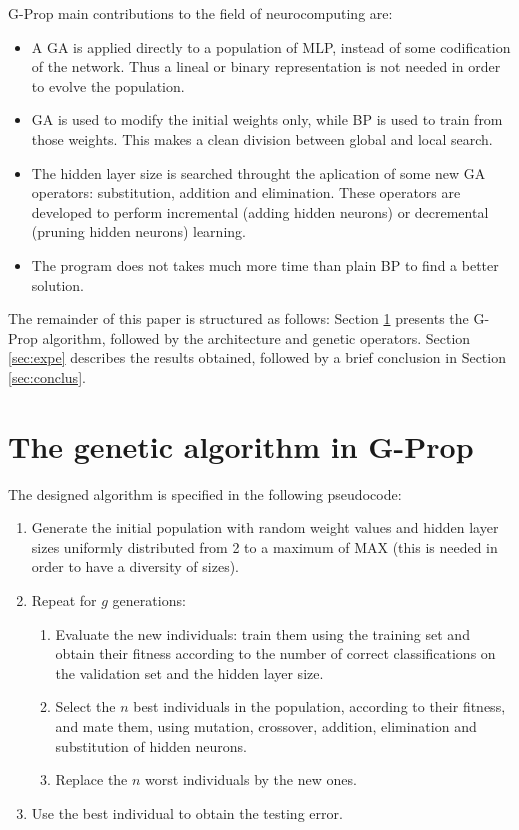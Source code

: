 \documentclass{elsart}
\begin{document}
G-Prop main contributions to the field of neurocomputing are: 
\begin{itemize}
      \item A GA is applied directly to a population of MLP, instead of some codification of the network. Thus a lineal or binary representation is not needed in order to evolve the population.
      \item GA is used to modify the initial weights only, while BP is used to train from those weights. This makes a clean division between global and local search.
      \item The hidden layer size is searched throught the aplication of some new GA operators: substitution, addition and elimination. These operators are developed to perform incremental (adding hidden neurons) or decremental (pruning hidden neurons) learning.
      \item The program does not takes much more time than plain BP to find a better solution.
\end{itemize}


The remainder of this paper is structured as follows: Section \ref{sec:method} presents the G-Prop algorithm, followed by the architecture and genetic operators. Section \ref{sec:expe} describes the results obtained, followed by a brief conclusion in Section \ref{sec:conclus}.
 

\section{The genetic algorithm in G-Prop}
\label{sec:method}

The designed algorithm is specified in the following pseudocode:

\begin{enumerate} 
	\item Generate the initial population with random weight values and hidden layer sizes uniformly distributed from 2 to a maximum of MAX (this is needed in order to have a diversity of sizes).
	\item Repeat for $g$ generations:
		\begin{enumerate} 
			\item Evaluate the new individuals: train them using the training set and obtain their fitness according to the number of correct classifications on the validation set and the hidden layer size.
			\item Select the $n$ best individuals in the population, according to their fitness, and mate them, using mutation, crossover, addition, elimination and substitution of hidden neurons.
			\item Replace the $n$ worst individuals by the new ones.
		\end{enumerate} 
	\item Use the best individual to obtain the testing error.
\end{enumerate} 
\end{document}
